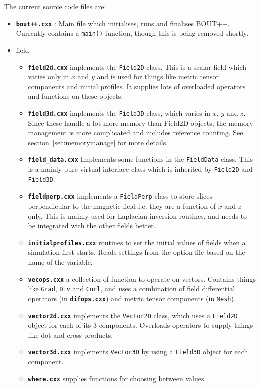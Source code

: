 \documentclass[12pt]{article}
\newcommand{\code}[1]{\texttt{#1}}
\newcommand{\file}[1]{\texttt{\bf #1}}
\begin{document}
The current source code files are:
\begin{itemize}
\item \file{bout++.cxx} : Main file which initialises, runs and finalises
  BOUT++. Currently contains a \code{main()} function, though this is
  being removed shortly.
\item field
  \begin{itemize}
  \item {} \file{field2d.cxx} implements the \code{Field2D} class. This is a
    scalar field which varies only in $x$ and $y$ and is used for things
    like metric tensor components and initial profiles. It supplies lots
    of overloaded operators and functions on these objects.
  \item \file{field3d.cxx} implements the \code{Field3D} class, which varies 
    in $x$, $y$ and $z$. Since these handle a lot more memory than Field2D
    objects, the memory management is more complicated and includes reference
    counting. See section~\ref{sec:memorymanage} for more details.
  \item \file{field\_data.cxx} Implements some functions in the \code{FieldData} class. This is a mainly pure virtual interface class which is inherited by \code{Field2D} and \code{Field3D}.
  \item \file{fieldperp.cxx} implements a \code{FieldPerp} class to store
    slices perpendicular to the magnetic field i.e. they are a function of
    $x$ and $z$ only. This is mainly used for Laplacian inversion routines,
    and needs to be integrated with the other fields better.
  \item \file{initialprofiles.cxx} routines to set the initial values of
    fields when a simulation first starts. Reads settings from the option
    file based on the name of the variable.
  \item \file{vecops.cxx} a collection of function to operate on vectors. 
    Contains things like \code{Grad}, \code{Div} and \code{Curl}, and uses
    a combination of field differential operators (in \file{difops.cxx}) and
    metric tensor components (in \code{Mesh}).
  \item \file{vector2d.cxx} implements the \code{Vector2D} class, which uses
    a \code{Field2D} object for each of its 3 components. Overloads operators 
    to supply things like dot and cross products.
  \item \file{vector3d.cxx} implements \code{Vector3D} by using a
    \code{Field3D} object for each component.
  \item \file{where.cxx} supplies functions for choosing between values

\end{itemize}
\end{itemize}
\end{document}

